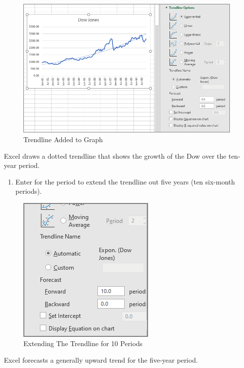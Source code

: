 \begin{figure}[H]
	\centering
	\includegraphics[width=\maxwidth{.95\linewidth}]{gfx/ch08_fig09}
	\caption{Trendline Added to Graph}
	\label{08:fig09}
\end{figure}

Excel draws a dotted trendline that shows the growth of the Dow over the ten-year period.

\begin{enumerate}[resume]
	\item Enter  for the  period to extend the trendline out five years (ten six-month periods).
\end{enumerate}

\begin{figure}[H]
	\centering
	\includegraphics[width=\maxwidth{.95\linewidth}]{gfx/ch08_fig10}
	\caption{Extending The Trendline for 10 Periods}
	\label{08:fig10}
\end{figure}

Excel forecasts a generally upward trend for the five-year period.

